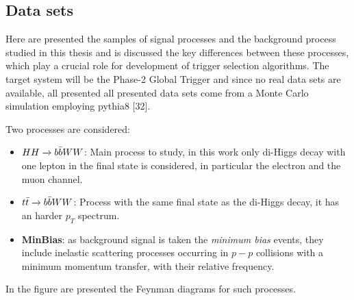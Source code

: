 \documentclass[../../main.tex]{subfiles}
\begin{document}
\subsection{Data sets}
Here are presented the samples of signal processes and the background process studied in this thesis and is discussed the key differences between these processes, which
play a crucial role for development of trigger selection algorithms. The target system will be the Phase-2 Global Trigger and since no real data sets are available, all presented 
all presented data sets come from a Monte Carlo simulation employing pythia8 [32].  

Two processes are considered:
\begin{itemize}
    \item \textbf{$HH \xrightarrow{} b \Bar{b}WW$}: Main process to study, in this work only di-Higgs decay with one lepton in the final state is considered, in particular the electron and the muon channel.
    \item \textbf{$t\Bar{t} \xrightarrow{} b \Bar{b}WW$}: Process with the same final state as the di-Higgs decay, it has an harder $p_T$ spectrum.
    \item \textbf{MinBias}: as background signal is taken the \textit{minimum bias} events, they include inelastic scattering processes occurring in $p-p$ collisions with a minimum momentum transfer, with their relative frequency. 
\end{itemize}

In the figure are presented the Feynman diagrams for such processes.
\end{document}
